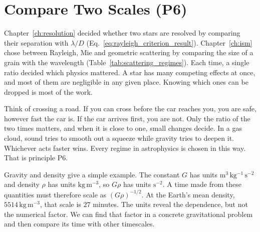 \section{Compare Two Scales (P6)}
\label{pr:sec:p6}

Chapter~\ref{ch:resolution} decided whether two stars are resolved by comparing their separation with $\lambda/D$ (Eq.~\eqref{eq:rayleigh_criterion_result}). Chapter~\ref{ch:ism} chose between Rayleigh, Mie and geometric scattering by comparing the size of a grain with the wavelength (Table~\ref{tab:scattering_regimes}). Each time, a single ratio decided which physics mattered. A star has many competing effects at once, and most of them are negligible in any given place. Knowing which ones can be dropped is most of the work.

Think of crossing a road. If you can cross before the car reaches you, you are safe, however fast the car is. If the car arrives first, you are not. Only the ratio of the two times matters, and when it is close to one, small changes decide. In a gas cloud, sound tries to smooth out a squeeze while gravity tries to deepen it. Whichever acts faster wins. Every regime in astrophysics is chosen in this way. That is principle P6.

Gravity and density give a simple example. The constant $G$ has units $\mathrm{m^3\,kg^{-1}\,s^{-2}}$ and density $\rho$ has units $\mathrm{kg\,m^{-3}}$, so $G\rho$ has units $\mathrm{s^{-2}}$. A time made from these quantities must therefore scale as $(G\rho)^{-1/2}$. At the Earth's mean density, $5514\,\mathrm{kg\,m^{-3}}$, that scale is $27$ minutes. The units reveal the dependence, but not the numerical factor. We can find that factor in a concrete gravitational problem and then compare its time with other timescales.

